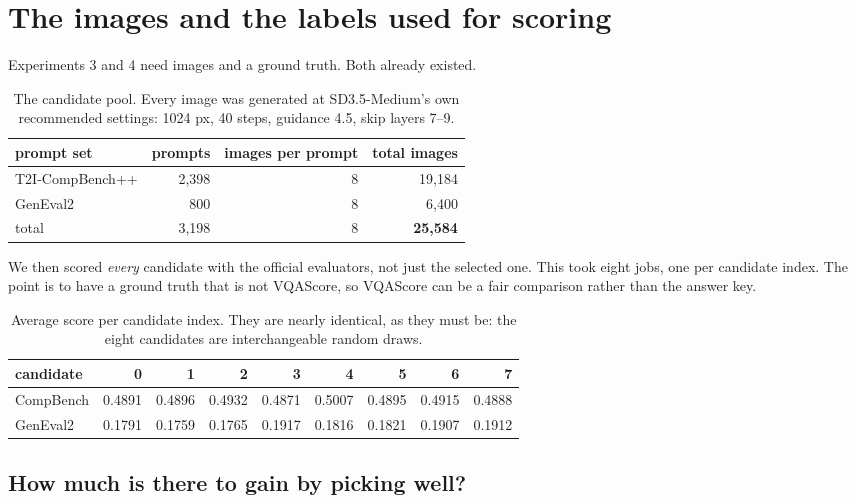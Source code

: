 \documentclass[11pt]{article}
\begin{document}
\section{The images and the labels used for scoring}

Experiments 3 and 4 need images and a ground truth. Both already existed.

\begin{table}[h]
\centering
\caption{The candidate pool. Every image was generated at SD3.5-Medium's own recommended settings:
1024 px, 40 steps, guidance 4.5, skip layers 7--9.}
\begin{tabular}{@{}lrrr@{}}
\toprule
prompt set & prompts & images per prompt & total images \\
\midrule
T2I-CompBench++ & 2{,}398 & 8 & 19{,}184 \\
GenEval2        &    800 & 8 &  6{,}400 \\
\midrule
total           & 3{,}198 & 8 & \textbf{25{,}584} \\
\bottomrule
\end{tabular}
\end{table}

We then scored \emph{every} candidate with the official evaluators, not just the selected one. This
took eight jobs, one per candidate index. The point is to have a ground truth that is not VQAScore,
so VQAScore can be a fair comparison rather than the answer key.

\begin{table}[h]
\centering
\caption{Average score per candidate index. They are nearly identical, as they must be: the eight
candidates are interchangeable random draws.}
\begin{tabular}{@{}lrrrrrrrr@{}}
\toprule
candidate & 0 & 1 & 2 & 3 & 4 & 5 & 6 & 7 \\
\midrule
CompBench & 0.4891 & 0.4896 & 0.4932 & 0.4871 & 0.5007 & 0.4895 & 0.4915 & 0.4888 \\
GenEval2  & 0.1791 & 0.1759 & 0.1765 & 0.1917 & 0.1816 & 0.1821 & 0.1907 & 0.1912 \\
\bottomrule
\end{tabular}
\end{table}

\subsection{How much is there to gain by picking well?}
\end{document}
